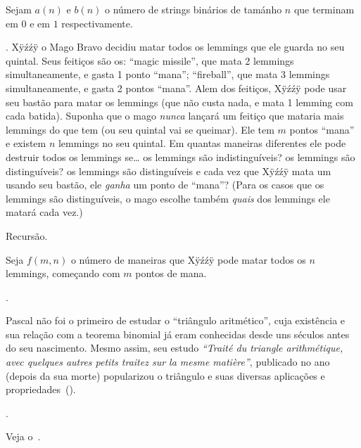 \hint
Sejam $a(n)$ e $b(n)$ o número de strings binários de tamánho $n$ que terminam em $0$ e em $1$ respectivamente.

\endproblem

\problem.
\label{xyzzy_lemmings}%
\def\MM{\ensuremath{\mathtt{M}}}
\def\FB{\ensuremath{\mathtt{F}}}
\def\ST{\ensuremath{\mathtt{B}}}
Xÿźźÿ o Mago Bravo decidiu matar todos os lemmings que ele guarda no seu quintal.
Seus feitiços são os:
\beginul
\li ``magic missile'', que mata 2 lemmings simultaneamente, e gasta 1 ponto ``mana'';
\li ``fireball'', que mata 3 lemmings simultaneamente, e gasta 2 pontos ``mana''.
\endul
\noindent
Alem dos feitiços, Xÿźźÿ pode usar seu bastão para matar
os lemmings (que não custa nada, e mata 1 lemming com cada batida).
\endgraf
Suponha que o mago \emph{nunca} lançará um feitiço que mataria mais lemmings do
que tem (ou seu quintal vai se queimar).
Ele tem $m$ pontos ``mana'' e existem $n$ lemmings no seu quintal.
Em quantas maneiras diferentes ele pode destruir todos os lemmings se\dots
\beginol
\li os lemmings são indistinguíveis?
\li os lemmings são distinguíveis?
\li os lemmings são distinguíveis e cada vez que Xÿźźÿ mata um usando seu bastão,
ele \emph{ganha} um ponto de ``mana''?
\endol
\noindent
(Para os casos que os lemmings são distinguíveis,
o mago escolhe também \emph{quais} dos lemmings ele matará cada vez.)

\hint
Recursão.

\hint
Seja $f(m,n)$ o número de maneiras que Xÿźźÿ pode matar todos os $n$ lemmings,
começando com $m$ pontos de mana.

\endproblem

\endproblems

\history.

Pascal não foi o primeiro de estudar o ``triângulo aritmético'',
cuja existência e sua relação com a teorema binomial já eram
conhecidas desde uns séculos antes do seu nascimento.
Mesmo assim, seu estudo
\emph{``Traité du triangle arithmétique, avec quelques autres petits traitez
sur la mesme matière''},
publicado no ano  (depois da sua morte)
popularizou o triângulo e suas diversas aplicações e
propriedades~(\cite{pascaltriangle}).

\endhistory

\further.

Veja o~\cite{nivencount}.

\endfurther


